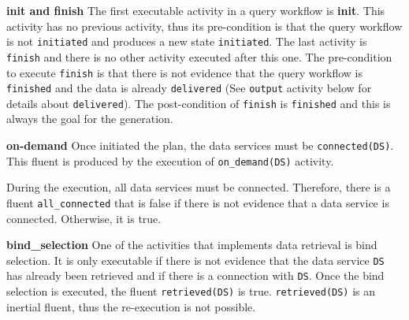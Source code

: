 \textbf{init and finish} The first executable activity in a query workflow is \textbf{init}. This activity has no previous activity, thus its pre-condition is that the query workflow is not \texttt{initiated} and produces a new state \texttt{initiated}. The last activity is \texttt{finish} and there is no other activity executed after this one. The pre-condition to execute \texttt{finish} is that there is not evidence that the query workflow is \texttt{finished} and the data is already \texttt{delivered} (See \texttt{output} activity below for details about \texttt{delivered}). The post-condition of \texttt{finish} is \texttt{finished} and this is always the goal for the generation.
                            
%


                   
\textbf{on-demand} Once initiated the plan, the data services must be \texttt{connected(DS)}. This fluent is produced by the execution of \texttt{on_demand(DS)} activity. 

%



During the execution, all data services must be connected. Therefore, there is a fluent \texttt{all_connected} that is false if there is not evidence that a data service is connected. Otherwise, it is true.

%


     
\textbf{bind_selection} One of the activities that implements data retrieval is bind selection. It is only executable if there is not evidence that the data service \texttt{DS} has already been retrieved and if there is a connection with \texttt{DS}. Once the bind selection is executed, the fluent \texttt{retrieved(DS)} is true. \texttt{retrieved(DS)} is an inertial fluent, thus the re-execution is not possible. 
      
